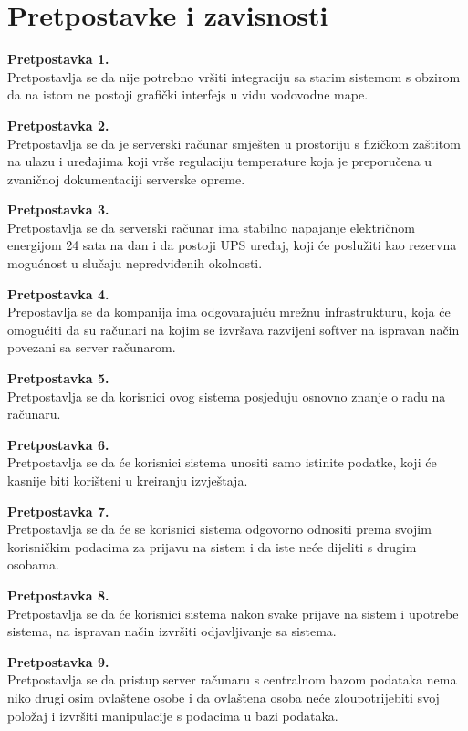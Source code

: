 \documentclass[]{report}
\begin{document}
\section{Pretpostavke i zavisnosti}

\textbf{Pretpostavka 1.}\\
Pretpostavlja se da nije potrebno vršiti integraciju sa starim sistemom s obzirom  da na istom ne postoji grafički interfejs u vidu vodovodne mape. 
 
 \noindent
\textbf{Pretpostavka 2.}\\
Pretpostavlja se da je serverski računar smješten u prostoriju s fizičkom zaštitom na ulazu i uređajima koji vrše regulaciju temperature koja je preporučena u zvaničnoj dokumentaciji serverske opreme. 

\noindent
\textbf{Pretpostavka 3.}\\
Pretpostavlja se da serverski računar ima stabilno napajanje električnom energijom 24 sata na dan i da postoji UPS uređaj, koji će poslužiti kao rezervna mogućnost u slučaju nepredviđenih okolnosti. 

\noindent
\textbf{Pretpostavka 4.}\\
Prepostavlja se da kompanija ima odgovarajuću mrežnu infrastrukturu, koja će omogućiti da su računari na kojim se izvršava razvijeni softver na ispravan način povezani sa server računarom. 

\noindent
\textbf{Pretpostavka 5.}\\
Pretpostavlja se da korisnici ovog sistema posjeduju osnovno znanje o radu na računaru. 

\noindent
\textbf{Pretpostavka 6.}\\
Pretpostavlja se da će korisnici sistema unositi samo istinite podatke, koji će kasnije biti korišteni u kreiranju izvještaja. 

\noindent
\textbf{Pretpostavka 7.}\\
Pretpostavlja se da će se korisnici sistema odgovorno odnositi prema svojim korisničkim podacima za prijavu na sistem i da iste neće dijeliti s drugim osobama. 

\noindent
\textbf{Pretpostavka 8.}\\
Pretpostavlja se da će korisnici sistema nakon svake prijave na sistem i upotrebe sistema, na ispravan način izvršiti odjavljivanje sa sistema. 

\noindent
\textbf{Pretpostavka 9.}\\
Pretpostavlja se da pristup server računaru s centralnom bazom podataka nema niko drugi osim ovlaštene osobe i da ovlaštena osoba neće zloupotrijebiti svoj položaj i izvršiti manipulacije s podacima u bazi podataka. 
 
\end{document}
